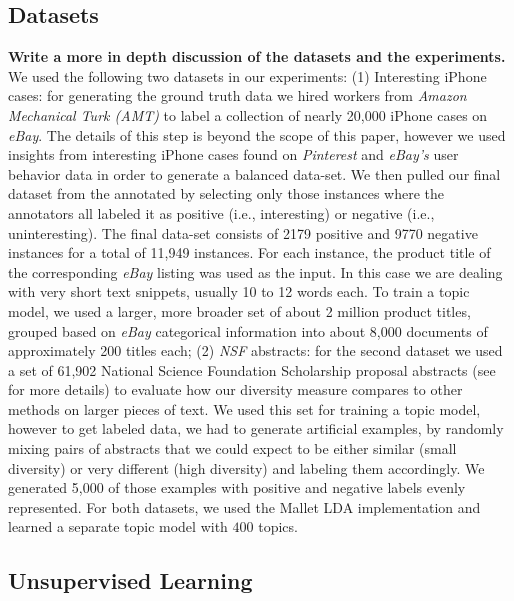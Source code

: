 \subsection{Datasets}
\label{sec:datasets}
{\bf Write a more in depth discussion of the datasets and the  experiments. }
We used the following two datasets in our experiments: (1) Interesting iPhone cases:
for generating the ground truth data we hired workers from {\em Amazon Mechanical Turk (AMT)} to label a collection
of nearly 20,000 iPhone cases on {\em eBay}. The details of this step is beyond the scope of this paper, however we used insights from
interesting iPhone cases found on {\em Pinterest} and {\em eBay's} user behavior data in order to generate a balanced data-set. 
We then pulled our final dataset from the annotated by selecting only those instances where the annotators all labeled it as
positive (i.e., interesting) or negative (i.e., uninteresting). The final data-set consists of 2179 positive and 9770 negative instances for
a total of 11,949 instances. For each instance, the product title of
the corresponding {\em eBay} listing was used as the input. In this case we are
dealing with very short text snippets, usually 10 to 12 words each. To
train a topic model, we used a larger, more broader set of about
2 million product titles, grouped based on {\em eBay} categorical information into about 8,000
documents of approximately 200 titles each; (2) {\em NSF}
abstracts: for the second dataset we used a set of 61,902 National Science Foundation
Scholarship proposal abstracts (see~\cite{bache:2013} for more details) to evaluate how our diversity measure
compares to other methods on larger pieces of text. We used this set
for training a topic model, however to get labeled data, we had to
generate artificial examples, by randomly mixing pairs of abstracts that we
could expect to be either similar (small diversity) or very different
(high diversity) and labeling them accordingly. We generated 5,000 of
those examples with positive and negative labels evenly represented. For both datasets, we used the Mallet LDA implementation and learned a separate topic model with $400$ topics.

\subsection{Unsupervised Learning}
\label{sec:unsupervised-learning}

